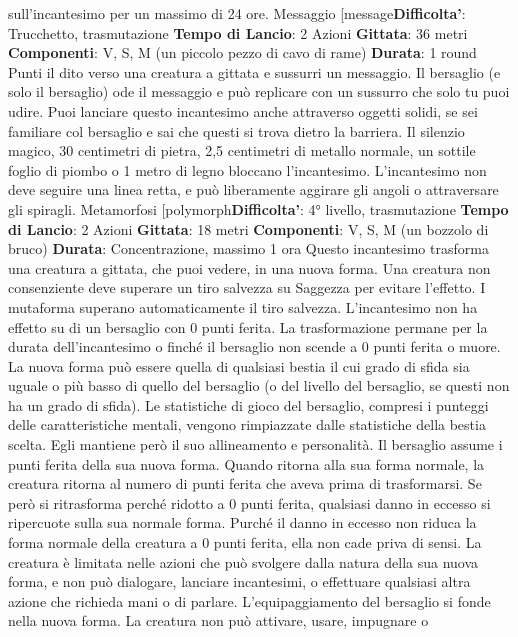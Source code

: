 \begin{multicols}{2}
sull’incantesimo per un massimo di 24 ore.
Messaggio
[message\textbf{Difficolta'}:
Trucchetto, trasmutazione
\textbf{Tempo di Lancio}: 2 Azioni
\textbf{Gittata}: 36 metri
\textbf{Componenti}: V, S, M (un piccolo pezzo di cavo di
rame)
\textbf{Durata}: 1 round
Punti il dito verso una creatura a gittata e sussurri un
messaggio. Il bersaglio (e solo il bersaglio) ode il
messaggio e può replicare con un sussurro che solo tu
puoi udire.
Puoi lanciare questo incantesimo anche attraverso
oggetti solidi, se sei familiare col bersaglio e sai che
questi si trova dietro la barriera. Il silenzio magico, 30
centimetri di pietra, 2,5 centimetri di metallo normale,
un sottile foglio di piombo o 1 metro di legno bloccano
l’incantesimo. L’incantesimo non deve seguire una linea
retta, e può liberamente aggirare gli angoli o
attraversare gli spiragli.
Metamorfosi
[polymorph\textbf{Difficolta'}:
4° livello, trasmutazione
\textbf{Tempo di Lancio}: 2 Azioni
\textbf{Gittata}: 18 metri
\textbf{Componenti}: V, S, M (un bozzolo di bruco)
\textbf{Durata}: Concentrazione, massimo 1 ora
Questo incantesimo trasforma una creatura a gittata,
che puoi vedere, in una nuova forma. Una creatura non
consenziente deve superare un tiro salvezza su
Saggezza per evitare l’effetto. I mutaforma superano
automaticamente il tiro salvezza. L’incantesimo non ha
effetto su di un bersaglio con 0 punti ferita.
La trasformazione permane per la durata
dell’incantesimo o finché il bersaglio non scende a 0
punti ferita o muore. La nuova forma può essere quella
di qualsiasi bestia il cui grado di sfida sia uguale o più
basso di quello del bersaglio (o del livello del bersaglio,
se questi non ha un grado di sfida). Le statistiche di
gioco del bersaglio, compresi i punteggi delle
caratteristiche mentali, vengono rimpiazzate dalle 
statistiche della bestia scelta. Egli mantiene però il suo
allineamento e personalità.
Il bersaglio assume i punti ferita della sua nuova forma.
Quando ritorna alla sua forma normale, la creatura
ritorna al numero di punti ferita che aveva prima di
trasformarsi. Se però si ritrasforma perché ridotto a 0
punti ferita, qualsiasi danno in eccesso si ripercuote
sulla sua normale forma. Purché il danno in eccesso
non riduca la forma normale della creatura a 0 punti
ferita, ella non cade priva di sensi.
La creatura è limitata nelle azioni che può svolgere
dalla natura della sua nuova forma, e non può
dialogare, lanciare incantesimi, o effettuare qualsiasi
altra azione che richieda mani o di parlare.
L’equipaggiamento del bersaglio si fonde nella nuova
forma. La creatura non può attivare, usare, impugnare o

\end{multicols}
